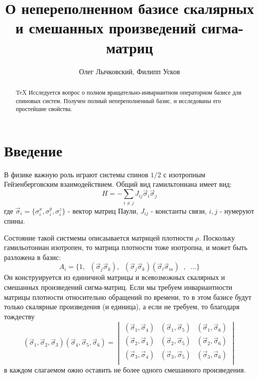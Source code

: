 \documentclass[]{article}
\title{О непереполненном базисе скалярных и смешанных произведений сигма-матриц}
\author{Олег Лычковский, Филипп Усков}
\renewcommand{\[}{\begin{equation}}
\renewcommand{\]}{\end{equation}}
\begin{document}
\maketitle

\begin{abstract}
	
\show \TeX
Исследуется вопрос о полном вращательно-инвариантном операторном базисе для спиновых систем. Получен полный непереполненный базис, и исследованы его простейшие свойства.

\end{abstract}

\section{Введение}

В физике важную роль играют системы спинов $1/2$ с изотропным Гейзенберговским взаимодействием. Общий вид гамильтониана имеет вид:
\[
H=-\sum_{i\neq j}J_{ij}\vec\sigma_i\vec\sigma_j 
\label{k1}
\]
где $\vec\sigma_i = \{\sigma_i^x,\sigma_i^y,\sigma_i^z\}$ - вектор матриц Паули, $J_{ij}$ - константы связи, $i,j$ - нумеруют спины.

Состояние такой систмемы описаывается матрицей плотности $\rho$.
Поскольку гамильотониан изотропен, то матрица плотности тоже изотропна, и может быть разложена в базис:
\[A_i=\{ 1,  \;\;({\vec \sigma}_j{\vec\sigma}_k), \;\;
({\vec \sigma}_j{\vec\sigma}_k)({\vec \sigma}_l{\vec\sigma}_m)\;\;,\;\;...\}
\label{k2}
\]
Он конструируется из единичной матрицы и всевозможных скалярных и смешанных произведений сигма-матриц. 
Если мы требуем инвариантности матрицы плотности относительно обращений по времени, то в этом базисе будут только скалярные произведения (и единица),
а если не требуем, то благодаря тождеству 
\[
(\vec\sigma_1,\vec\sigma_2,\vec\sigma_3)
(\vec\sigma_4,\vec\sigma_5,\vec\sigma_6)= 
\begin{vmatrix}
	(\vec\sigma_1,\vec\sigma_4) & 	(\vec\sigma_1,\vec\sigma_5) & (\vec\sigma_1,\vec\sigma_6) \\
	(\vec\sigma_2,\vec\sigma_4) & 	(\vec\sigma_2,\vec\sigma_5) & (\vec\sigma_2,\vec\sigma_6) \\
	(\vec\sigma_3,\vec\sigma_4) & 	(\vec\sigma_3,\vec\sigma_5) & (\vec\sigma_3,\vec\sigma_6) \\
\end{vmatrix}
\label{k3}
\]
в каждом слагаемом ожно оставить не более одного смешанного произведения.
\end{document}
